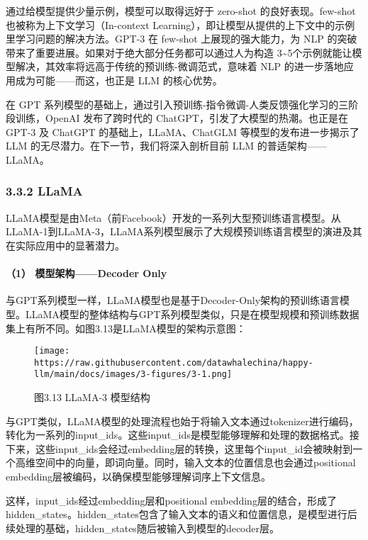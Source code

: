 \documentclass[
]{article}
\begin{document}
通过给模型提供少量示例，模型可以取得远好于 zero-shot
的良好表现。few-shot 也被称为上下文学习（In-context
Learning），即让模型从提供的上下文中的示例里学习问题的解决方法。GPT-3 在
few-shot 上展现的强大能力，为 NLP
的突破带来了重要进展。如果对于绝大部分任务都可以通过人为构造
3\textasciitilde5个示例就能让模型解决，其效率将远高于传统的预训练-微调范式，意味着
NLP 的进一步落地应用成为可能------而这，也正是 LLM 的核心优势。

在 GPT
系列模型的基础上，通过引入预训练-指令微调-人类反馈强化学习的三阶段训练，OpenAI
发布了跨时代的 ChatGPT，引发了大模型的热潮。也正是在 GPT-3 及 ChatGPT
的基础上，LLaMA、ChatGLM 等模型的发布进一步揭示了 LLM
的无尽潜力。在下一节，我们将深入剖析目前 LLM 的普适架构------LLaMA。

\subsubsection{3.3.2 LLaMA}\label{llama}

LLaMA模型是由Meta（前Facebook）开发的一系列大型预训练语言模型。从LLaMA-1到LLaMA-3，LLaMA系列模型展示了大规模预训练语言模型的演进及其在实际应用中的显著潜力。

\paragraph{（1） 模型架构------Decoder
Only}\label{ux6a21ux578bux67b6ux6784decoder-only-1}

与GPT系列模型一样，LLaMA模型也是基于Decoder-Only架构的预训练语言模型。LLaMA模型的整体结构与GPT系列模型类似，只是在模型规模和预训练数据集上有所不同。如图3.13是LLaMA模型的架构示意图：

\begin{figure}[htbp]\centering
\texttt{[image: https://raw.githubusercontent.com/datawhalechina/happy-llm/main/docs/images/3-figures/3-1.png]}
\caption{图3.13 LLaMA-3 模型结构}
\end{figure}

与GPT类似，LLaMA模型的处理流程也始于将输入文本通过tokenizer进行编码，转化为一系列的input\_ids。这些input\_ids是模型能够理解和处理的数据格式。接下来，这些input\_ids会经过embedding层的转换，这里每个input\_id会被映射到一个高维空间中的向量，即词向量。同时，输入文本的位置信息也会通过positional
embedding层被编码，以确保模型能够理解词序上下文信息。

这样，input\_ids经过embedding层和positional
embedding层的结合，形成了hidden\_states。hidden\_states包含了输入文本的语义和位置信息，是模型进行后续处理的基础，hidden\_states随后被输入到模型的decoder层。
\end{document}

